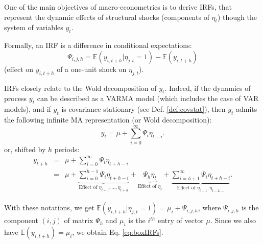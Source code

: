\documentclass[
  11pt,
]{book}
\theoremstyle{definition}
\theoremstyle{definition}
\theoremstyle{definition}
\theoremstyle{definition}
\theoremstyle{remark}
\begin{document}
One of the main objectives of macro-econometrics is to derive IRFs, that represent the dynamic effects of structural shocks (components of \(\eta_t\)) though the system of variables \(y_t\).

Formally, an IRF is a difference in conditional expectations:
\begin{equation}
\boxed{\Psi_{i,j,h} = \mathbb{E}(y_{i,t+h}|\eta_{j,t}=1) - \mathbb{E}(y_{i,t+h})}
\label{eq:boxIRFs}
\end{equation}
(effect on \(y_{i,t+h}\) of a one-unit shock on \(\eta_{j,t}\)).

IRFs closely relate to the Wold decomposition of \(y_t\). Indeed, if the dynamics of process \(y_t\) can be described as a VARMA model (which includes the case of VAR models), and if \(y_t\) is covariance stationary (see Def. \ref{def:covstat}), then \(y_t\) admits the following infinite MA representation (or Wold decomposition):
\begin{equation}
\boxed{y_t = \mu + \sum_{i=0}^\infty \Psi_{i} \eta_{t-i}.}
\label{eq:InfMA}
\end{equation}
or, shifted by \(h\) periods:
\begin{eqnarray*}
y_{t+h} &=& \mu + \sum_{i=0}^\infty \Psi_{i} \eta_{t+h-i}\\
&=& \mu + \underbrace{\sum_{i=0}^{h-1} \Psi_{i} \eta_{t+h-i}}_{\mbox{Effect of }\eta_{t+1},\dots,\eta_{t+h}} + \underbrace{\Psi_{h} \eta_{t}}_{\mbox{Effect of }\eta_{t}} + \underbrace{\sum_{i=h+1}^\infty \Psi_{i} \eta_{t+h-i}}_{\mbox{Effect of }\eta_{t-1},\eta_{t-2,\dots}}.
\end{eqnarray*}

With these notations, we get \(\mathbb{E}(y_{i,t+h}|\eta_{j,t}=1) = \mu_i + \Psi_{i,j,h}\), where \(\Psi_{i,j,h}\) is the component \((i,j)\) of matrix \(\Psi_h\) and \(\mu_i\) is the \(i^{th}\) entry of vector \(\mu\). Since we also have \(\mathbb{E}(y_{i,t+h})=\mu_i\), we obtain Eq. \eqref{eq:boxIRFs}.
\end{document}
